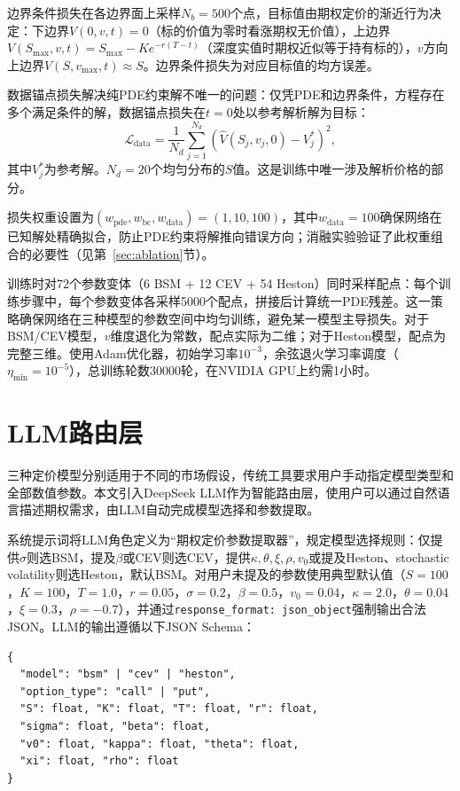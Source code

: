 边界条件损失在各边界面上采样$N_b=500$个点，目标值由期权定价的渐近行为决定：下边界$V(0,v,t)=0$（标的价值为零时看涨期权无价值），上边界$V(S_\text{max},v,t)=S_\text{max}-Ke^{-r(T-t)}$（深度实值时期权近似等于持有标的），$v$方向上边界$V(S,v_\text{max},t)\approx S$。边界条件损失为对应目标值的均方误差。

数据锚点损失解决纯PDE约束解不唯一的问题：仅凭PDE和边界条件，方程存在多个满足条件的解，数据锚点损失在$t=0$处以参考解析解为目标：
\begin{equation}
  \mathcal{L}_\text{data} = \frac{1}{N_d}\sum_{j=1}^{N_d}
    \left(\hat{V}(S_j,v_j,0) - V_j^*\right)^2,
\end{equation}
其中$V_j^*$为参考解。$N_d=20$个均匀分布的$S$值。这是训练中唯一涉及解析价格的部分。

损失权重设置为$(w_\text{pde}, w_\text{bc}, w_\text{data})=(1, 10, 100)$，其中$w_\text{data}=100$确保网络在已知解处精确拟合，防止PDE约束将解推向错误方向；消融实验验证了此权重组合的必要性（见第~\ref{sec:ablation}节）。

训练时对72个参数变体（6 BSM + 12 CEV + 54 Heston）同时采样配点：每个训练步骤中，每个参数变体各采样5000个配点，拼接后计算统一PDE残差。这一策略确保网络在三种模型的参数空间中均匀训练，避免某一模型主导损失。对于BSM/CEV模型，$v$维度退化为常数，配点实际为二维；对于Heston模型，配点为完整三维。使用Adam优化器\cite{kingma2014adam}，初始学习率$10^{-3}$，余弦退火学习率调度（$\eta_\text{min}=10^{-5}$），总训练轮数30000轮，在NVIDIA GPU上约需1小时。

\section{LLM路由层}\label{sec:llm_router}

三种定价模型分别适用于不同的市场假设，传统工具要求用户手动指定模型类型和全部数值参数。本文引入DeepSeek LLM作为智能路由层，使用户可以通过自然语言描述期权需求，由LLM自动完成模型选择和参数提取。

系统提示词将LLM角色定义为``期权定价参数提取器''，规定模型选择规则：仅提供$\sigma$则选BSM，提及$\beta$或CEV则选CEV，提供$\kappa,\theta,\xi,\rho,v_0$或提及Heston、stochastic volatility则选Heston，默认BSM。对用户未提及的参数使用典型默认值（$S=100$，$K=100$，$T=1.0$，$r=0.05$，$\sigma=0.2$，$\beta=0.5$，$v_0=0.04$，$\kappa=2.0$，$\theta=0.04$，$\xi=0.3$，$\rho=-0.7$），并通过\texttt{response\_format: json\_object}强制输出合法JSON。LLM的输出遵循以下JSON Schema：
\begin{verbatim}
{
  "model": "bsm" | "cev" | "heston",
  "option_type": "call" | "put",
  "S": float, "K": float, "T": float, "r": float,
  "sigma": float, "beta": float,
  "v0": float, "kappa": float, "theta": float,
  "xi": float, "rho": float
}
\end{verbatim}

